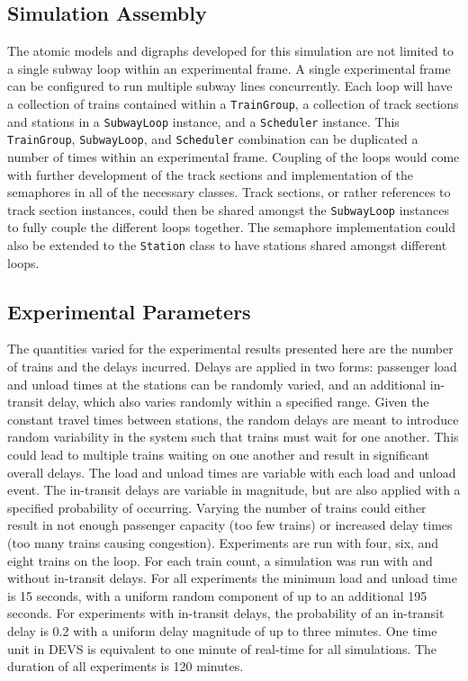 \subsection{Simulation Assembly}
The atomic models and digraphs developed for this simulation are not limited to a single subway loop within an experimental frame.  A single experimental frame can be configured to run multiple subway lines concurrently.  Each loop will have a collection of trains contained within a \texttt{TrainGroup}, a collection of track sections and stations in a \texttt{SubwayLoop} instance, and a \texttt{Scheduler} instance.  This \texttt{TrainGroup}, \texttt{SubwayLoop}, and \texttt{Scheduler} combination can be duplicated a number of times within an experimental frame.  Coupling of the loops would come with further development of the track sections and implementation of the semaphores in all of the necessary classes.  Track sections, or rather references to track section instances, could then be shared amongst the \texttt{SubwayLoop} instances to fully couple the different loops together.  The semaphore implementation could also be extended to the \texttt{Station} class to have stations shared amongst different loops.

\subsection{Experimental Parameters}
The quantities varied for the experimental results presented here are the number of trains and the delays incurred.  Delays are applied in two forms: passenger load and unload times at the stations can be randomly varied, and an additional in-transit delay, which also varies randomly within a specified range. Given the constant travel times between stations, the random delays are meant to introduce random variability in the system such that trains must wait for one another.  This could lead to multiple trains waiting on one another and result in significant overall delays.  The load and unload times are variable with each load and unload event.  The in-transit delays are variable in magnitude, but are also applied with a specified probability of occurring. Varying the number of trains could either result in not enough passenger capacity (too few trains) or increased delay times (too many trains causing congestion).  Experiments are run with four, six, and eight trains on the loop.  For each train count, a simulation was run with and without in-transit delays. For all experiments the minimum load and unload time is 15 seconds, with a uniform random component of up to an additional 195 seconds.  For experiments with in-transit delays, the probability of an in-transit delay is 0.2 with a uniform delay magnitude of up to three minutes. One time unit in DEVS is equivalent to one minute of real-time for all simulations.  The duration of all experiments is 120 minutes.
